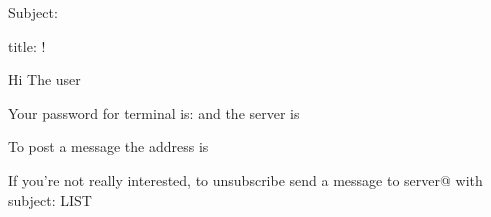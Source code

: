 Subject:

title: !

Hi %
The user %

Your password for terminal is:
and the server is %

To post a message the address is %

If you're not really interested, to unsubscribe send a message to server@%
with subject:
LIST %
